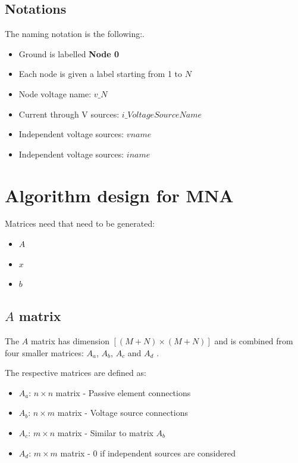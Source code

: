 \documentclass[a4paper, titlepage]{article}
\begin{document}
    \subsection{Notations}
    The naming notation is the following:\cite{nodeanalysis}.
    \begin{itemize}
        \item Ground is labelled \textbf{Node 0}
        \item Each node is given a label starting from 1 to $N$ 
        \item Node voltage name: $v\_N$
        \item Current through V sources: $i\_VoltageSourceName$
        \item Independent voltage sources: $vname$
        \item Independent voltage sources: $iname$
    \end{itemize}

    \pagebreak
    \section{Algorithm design for MNA}
    Matrices need that need to be generated:
    \begin{itemize}
        \item $A$ 
        \item $x$ 
        \item $b$
    \end{itemize}
    \subsection{$A$ matrix}
    The $A$ matrix has dimension $[(M+N) \times (M+N)]$ and is combined from four smaller matrices: $A_a$, $A_b$, $A_c$ and $A_d$ \cite{nodeanalysis}.
    \par
    The respective matrices are defined as:
    \begin{itemize}
        \item $A_a$: $n \times n$ matrix - Passive element connections
        \item $A_b$: $n \times m$ matrix - Voltage source connections 
        \item $A_c$: $m \times n$ matrix - Similar to matrix $A_b$
        \item $A_d$: $m \times m$ matrix - 0 if independent sources are considered
    \end{itemize}
\end{document}
